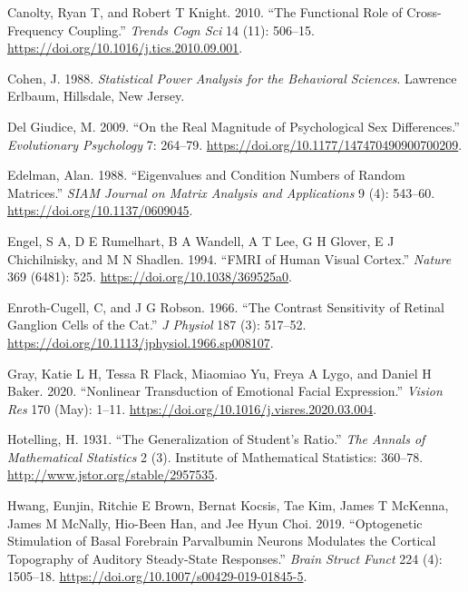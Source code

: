 \documentclass[]{article}
\begin{document}
\leavevmode\hypertarget{ref-Canolty2010}{}%
Canolty, Ryan T, and Robert T Knight. 2010. ``The Functional Role of Cross-Frequency Coupling.'' \emph{Trends Cogn Sci} 14 (11): 506--15. \url{https://doi.org/10.1016/j.tics.2010.09.001}.

\leavevmode\hypertarget{ref-Cohen1988}{}%
Cohen, J. 1988. \emph{Statistical Power Analysis for the Behavioral Sciences}. Lawrence Erlbaum, Hillsdale, New Jersey.

\leavevmode\hypertarget{ref-Giudice2009}{}%
Del Giudice, M. 2009. ``On the Real Magnitude of Psychological Sex Differences.'' \emph{Evolutionary Psychology} 7: 264--79. \url{https://doi.org/10.1177/147470490900700209}.

\leavevmode\hypertarget{ref-Edelman1988}{}%
Edelman, Alan. 1988. ``Eigenvalues and Condition Numbers of Random Matrices.'' \emph{SIAM Journal on Matrix Analysis and Applications} 9 (4): 543--60. \url{https://doi.org/10.1137/0609045}.

\leavevmode\hypertarget{ref-Engel1994}{}%
Engel, S A, D E Rumelhart, B A Wandell, A T Lee, G H Glover, E J Chichilnisky, and M N Shadlen. 1994. ``FMRI of Human Visual Cortex.'' \emph{Nature} 369 (6481): 525. \url{https://doi.org/10.1038/369525a0}.

\leavevmode\hypertarget{ref-Enroth-Cugell1966}{}%
Enroth-Cugell, C, and J G Robson. 1966. ``The Contrast Sensitivity of Retinal Ganglion Cells of the Cat.'' \emph{J Physiol} 187 (3): 517--52. \url{https://doi.org/10.1113/jphysiol.1966.sp008107}.

\leavevmode\hypertarget{ref-Gray2020}{}%
Gray, Katie L H, Tessa R Flack, Miaomiao Yu, Freya A Lygo, and Daniel H Baker. 2020. ``Nonlinear Transduction of Emotional Facial Expression.'' \emph{Vision Res} 170 (May): 1--11. \url{https://doi.org/10.1016/j.visres.2020.03.004}.

\leavevmode\hypertarget{ref-Hotelling1931}{}%
Hotelling, H. 1931. ``The Generalization of Student's Ratio.'' \emph{The Annals of Mathematical Statistics} 2 (3). Institute of Mathematical Statistics: 360--78. \url{http://www.jstor.org/stable/2957535}.

\leavevmode\hypertarget{ref-Hwang2019}{}%
Hwang, Eunjin, Ritchie E Brown, Bernat Kocsis, Tae Kim, James T McKenna, James M McNally, Hio-Been Han, and Jee Hyun Choi. 2019. ``Optogenetic Stimulation of Basal Forebrain Parvalbumin Neurons Modulates the Cortical Topography of Auditory Steady-State Responses.'' \emph{Brain Struct Funct} 224 (4): 1505--18. \url{https://doi.org/10.1007/s00429-019-01845-5}.
\end{document}
